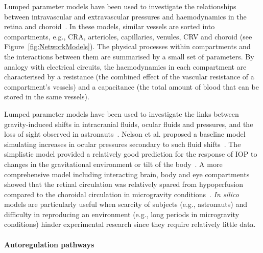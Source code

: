 \documentclass{article}
\begin{document}
Lumped parameter models have been used to investigate the relationships between intravascular and extravascular pressures and haemodynamics in the retina and choroid~\cite{Chiaravalli_2021,Fawzi_2019,Guidoboni_2014a,Nelson_2017,Petersen_2022,Prudhomme_2021,Sala_2020,Salerni_2019}.
In these models, similar vessels are sorted into compartments, e.g., CRA, arterioles, capillaries, venules, CRV and choroid (see Figure~\ref{fig:NetworkModels}).
The physical processes within compartments and the interactions between them are summarised by a small set of parameters.
By analogy with electrical circuits, the haemodynamics in each compartment are characterised by a resistance (the combined effect of the vascular resistance of a compartment's vessels) and a capacitance (the total amount of blood that can be stored in the same vessels).

Lumped parameter models have been used to investigate the links between gravity-induced shifts in intracranial fluids, ocular fluids and pressures, and the loss of sight observed in astronauts~\cite{Nelson_2017,Petersen_2022,Salerni_2019}.
Nelson et al. proposed a baseline model simulating increases in ocular pressures secondary to such fluid shifts~\cite{Nelson_2017}.
The simplistic model provided a relatively good prediction for the response of IOP to changes in the gravitational environment or tilt of the body~\cite{Nelson_2017,Petersen_2022}.
A more comprehensive model including interacting brain, body and eye compartments showed that the retinal circulation was relatively spared from hypoperfusion compared to the choroidal circulation in microgravity conditions~\cite{Salerni_2019}.
\textit{In silico} models are particularly useful when scarcity of subjects (e.g., astronauts) and difficulty in reproducing an environment (e.g., long periods in microgravity conditions) hinder experimental research since they require relatively little data.

\paragraph*{Autoregulation pathways}
\end{document}
